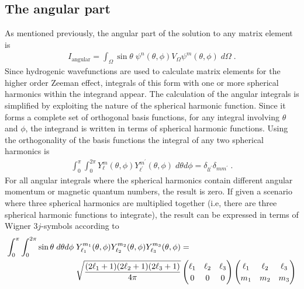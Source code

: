         \subsection{The angular part} \label{sec:The_Angular_Part}
        As mentioned previously, the angular part of the solution to any matrix element is
        \begin{align}
            I_{\text{angular}} = \int_\Omega \sin \theta \; \psi^n(\theta, \phi) V_\Omega \psi^m(\theta, \phi) \; d\Omega\;. \label{eq:hydrogen_spherical_harmonic}
        \end{align}
        \noindent Since hydrogenic wavefunctions are used to calculate matrix elements for the higher order Zeeman effect, integrals of this form with one or more spherical harmonics within the integrand appear. The calculation of the angular integrals is simplified by exploiting the nature of the spherical harmonic function. Since it forms a complete set of orthogonal basis functions, for any integral involving $\theta$ and $\phi$, the integrand is written in terms of spherical harmonic functions. Using the orthogonality of the basis functions the integral of any two spherical harmonics is
        \begin{align}
            \int_0^\pi \int_0^{2\pi} Y^m_\ell(\theta, \phi) Y^{m^\prime}_{\ell^\prime} (\theta, \phi) \; d\theta d\phi = \delta_{ll^\prime} \delta_{mm^\prime}\label{eq:delta_spherical_harmonic}\;.
        \end{align}
        \noindent For all angular integrals where the spherical harmonics contain different angular momentum or magnetic quantum numbers, the result is zero. If given a scenario where three spherical harmonics are multiplied together (i.e, there are three spherical harmonic functions to integrate), the result can be expressed in terms of Wigner $3j$-symbols according to \cite{Wigner-3j}
        \begin{align}
            \int_0^\pi \int_0^{2\pi} \sin \theta \; d\theta d\phi\;& Y^{m_1}_{{\ell_1}}(\theta, \phi) Y^{m_2}_{{\ell_2}} (\theta, \phi) Y^{m_3}_{{\ell_3}} (\theta, \phi) =\\
             &\sqrt{\frac{(2\ell_1 + 1)(2\ell_2 + 1) (2\ell_3 + 1)}{4 \pi}} 
             \renewcommand{\arraystretch}{1.2}\begin{pmatrix} \ell_1 & \ell_2 & \ell_3 \\ 0 & 0 & 0 \end{pmatrix}
             \renewcommand{\arraystretch}{1.2}\begin{pmatrix} \ell_1 & \ell_2 & \ell_3 \\ m_1 & m_2 & m_3 \end{pmatrix} \nonumber
        \end{align}
